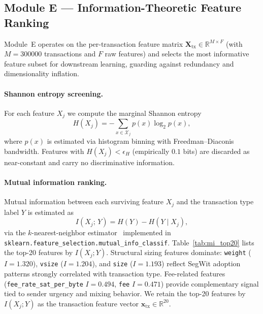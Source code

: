 \subsection{Module E — Information-Theoretic Feature Ranking}
\label{sec:module_e}

Module~E operates on the per-transaction feature matrix
$\mathbf{X}_{\mathrm{tx}} \in \mathbb{R}^{M \times F}$ (with
$M = \num{300000}$ transactions and $F$ raw features) and selects the most
informative feature subset for downstream learning, guarding against
redundancy and dimensionality inflation.

\paragraph{Shannon entropy screening.}
For each feature $X_j$ we compute the marginal Shannon entropy
\begin{equation}
  H(X_j) = -\sum_{x \in \mathcal{X}_j} p(x)\log_2 p(x),
  \label{eq:entropy}
\end{equation}
where $p(x)$ is estimated via histogram binning with Freedman--Diaconis
bandwidth.
Features with $H(X_j) < \epsilon_H$ (empirically $0.1$ bits) are discarded
as near-constant and carry no discriminative information.

\paragraph{Mutual information ranking.}
Mutual information between each surviving feature $X_j$ and the transaction
type label $Y$ is estimated as
\begin{equation}
  I(X_j;\, Y) = H(Y) - H(Y \mid X_j),
  \label{eq:mi}
\end{equation}
via the $k$-nearest-neighbor estimator~\cite{ross2014mutual} implemented in
\texttt{sklearn.feature\_selection.mutual\_info\_classif}.
Table~\ref{tab:mi_top20} lists the top-20 features by $I(X_j; Y)$.
Structural sizing features dominate: \texttt{weight} ($I = 1.320$),
\texttt{vsize} ($I = 1.204$), and \texttt{size} ($I = 1.193$) reflect
SegWit adoption patterns strongly correlated with transaction type.
Fee-related features (\texttt{fee\_rate\_sat\_per\_byte} $I = 0.494$,
\texttt{fee} $I = 0.471$) provide complementary signal tied to sender
urgency and mixing behavior.
We retain the top-20 features by $I(X_j; Y)$ as the transaction feature
vector $\mathbf{x}_{\mathrm{tx}} \in \mathbb{R}^{20}$.

